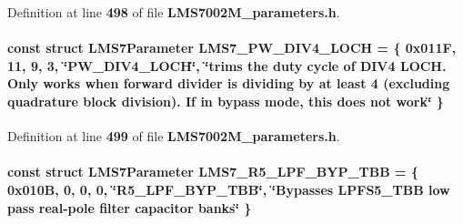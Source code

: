 Definition at line {\bf 498} of file {\bf L\+M\+S7002\+M\+\_\+parameters.\+h}.

\paragraph[{L\+M\+S7\+\_\+\+P\+W\+\_\+\+D\+I\+V4\+\_\+\+L\+O\+CH}]{\setlength{\rightskip}{0pt plus 5cm}const struct {\bf L\+M\+S7\+Parameter} L\+M\+S7\+\_\+\+P\+W\+\_\+\+D\+I\+V4\+\_\+\+L\+O\+CH = \{ 0x011\+F, 11, 9, 3, \char`\"{}\+P\+W\+\_\+\+D\+I\+V4\+\_\+\+L\+O\+C\+H\char`\"{}, \char`\"{}trims the duty cycle of D\+I\+V4 L\+O\+C\+H. Only works when forward divider is dividing by at least 4 (excluding quadrature block division). If in bypass mode, this does not work\char`\"{} \}\hspace{0.3cm}{\ttfamily [static]}}\label{LMS7002M__parameters_8h_a6bdea0a8335c01777dd2b3a03e03aa1c}


Definition at line {\bf 499} of file {\bf L\+M\+S7002\+M\+\_\+parameters.\+h}.

\paragraph[{L\+M\+S7\+\_\+\+R5\+\_\+\+L\+P\+F\+\_\+\+B\+Y\+P\+\_\+\+T\+BB}]{\setlength{\rightskip}{0pt plus 5cm}const struct {\bf L\+M\+S7\+Parameter} L\+M\+S7\+\_\+\+R5\+\_\+\+L\+P\+F\+\_\+\+B\+Y\+P\+\_\+\+T\+BB = \{ 0x010\+B, 0, 0, 0, \char`\"{}\+R5\+\_\+\+L\+P\+F\+\_\+\+B\+Y\+P\+\_\+\+T\+B\+B\char`\"{}, \char`\"{}\+Bypasses L\+P\+F\+S5\+\_\+\+T\+B\+B low pass real-\/pole filter capacitor banks\char`\"{} \}\hspace{0.3cm}{\ttfamily [static]}}\label{LMS7002M__parameters_8h_ac996c91c41b54e20530746c40460b6f1}


